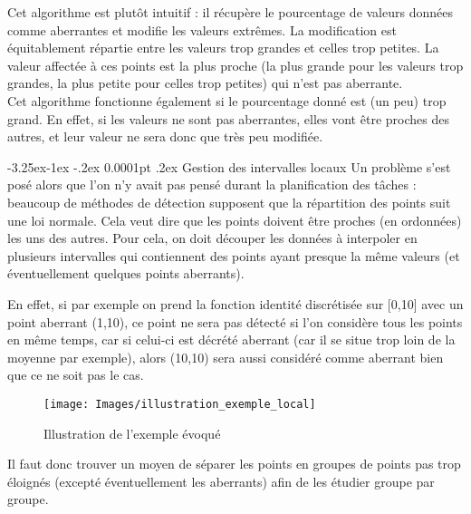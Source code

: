 \documentclass[a4paper,12pt]{article} %
\makeatletter
\renewcommand\paragraph{\@startsection{paragraph}{4}{\z@}%
                                      {-3.25ex\@plus -1ex \@minus -.2ex}%
                                      {0.0001pt \@plus .2ex}%
                                      {\normalfont\normalsize\bfseries}}
\makeatother
\begin{document}
				    Cet algorithme est plutôt intuitif : il récupère le pourcentage de valeurs données comme aberrantes et modifie les valeurs extrêmes. La modification est équitablement répartie entre les valeurs trop grandes et celles trop petites. La valeur affectée à ces points est la plus proche (la plus grande pour les valeurs trop grandes, la plus petite pour celles trop petites) qui n'est pas aberrante.\\
				    
                    Cet algorithme fonctionne également si le pourcentage donné est (un peu) trop grand. En effet, si les valeurs ne sont pas aberrantes, elles vont être proches des autres, et leur valeur ne sera donc que très peu modifiée.

				\paragraph{Gestion des intervalles locaux}  
    				Un problème s'est posé alors que l'on n'y avait pas pensé durant la planification des tâches : beaucoup de méthodes de détection supposent que la répartition des points suit une loi normale. Cela veut dire que les points doivent être proches (en ordonnées) les uns des autres. Pour cela, on doit découper les données à interpoler en plusieurs intervalles qui contiennent des points ayant presque la même valeurs (et éventuellement quelques points aberrants).
    				
    				En effet, si par exemple on prend la fonction identité discrétisée sur [0,10] avec un point aberrant (1,10), ce point ne sera pas détecté si l'on considère tous les points en même temps, car si celui-ci est décrété aberrant (car il se situe trop loin de la moyenne par exemple), alors (10,10) sera aussi considéré comme aberrant bien que ce ne soit pas le cas. 
    				
    				\begin{figure}[H]
                \begin{center}
                \texttt{[image: Images/illustration\_exemple\_local]} 
                \end{center}
                \caption{Illustration de l'exemple évoqué}
                \label{NUL3}
                \end{figure}
    				
    				Il faut donc trouver un moyen de séparer les points en groupes de points pas trop éloignés (excepté éventuellement les aberrants) afin de les étudier groupe par groupe.
    				
\end{document}
